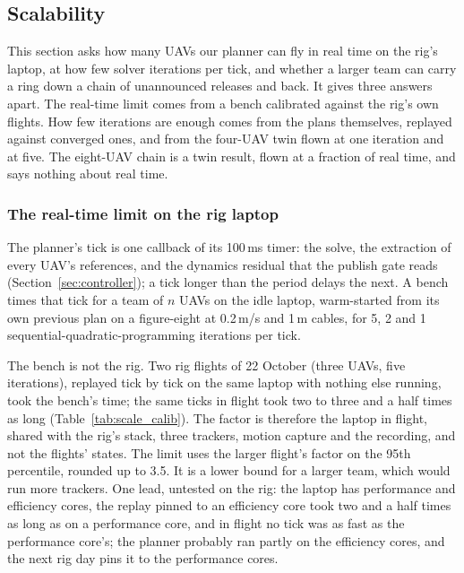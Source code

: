 \subsection{Scalability}
\label{sec:res_scale}

This section asks how many UAVs our planner can fly in real time on the rig's laptop, at how few solver iterations
per tick, and whether a larger team can carry a ring down a chain of unannounced releases and back. It gives three
answers apart. The real-time limit comes from a bench calibrated against the rig's own flights. How few iterations
are enough comes from the plans themselves, replayed against converged ones, and from the four-UAV twin flown at one
iteration and at five. The eight-UAV chain is a twin result, flown at a fraction of real time, and says nothing about
real time.

\subsubsection{The real-time limit on the rig laptop}

The planner's tick is one callback of its 100\,ms timer: the solve, the extraction of every UAV's references, and the
dynamics residual that the publish gate reads (Section~\ref{sec:controller}); a tick longer than the period delays
the next. A bench times that tick for a team of $n$ UAVs on the idle laptop, warm-started from its own previous plan
on a figure-eight at 0.2\,m/s and 1\,m cables, for 5, 2 and 1 sequential-quadratic-programming iterations per tick.

The bench is not the rig. Two rig flights of 22 October (three UAVs, five iterations), replayed tick by tick on the
same laptop with nothing else running, took the bench's time; the same ticks in flight took two to three and a half
times as long (Table~\ref{tab:scale_calib}). The factor is therefore the laptop in flight, shared with the rig's stack,
three trackers, motion capture and the recording, and not the flights' states. The limit uses the larger flight's
factor on the 95th percentile, rounded up to 3.5. It is a lower bound for a larger team, which would run more
trackers. One lead, untested on the rig: the laptop has performance and efficiency cores, the replay pinned to an
efficiency core took two and a half times as long as on a performance core, and in flight no tick was as fast as the
performance core's; the planner probably ran partly on the efficiency cores, and the next rig day pins it to the
performance cores.

